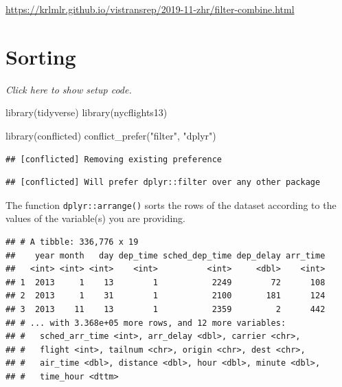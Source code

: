 \documentclass[]{book}
\newenvironment{Shaded}{}{}
\newcommand{\KeywordTok}[1]{\textcolor[rgb]{0.00,0.00,1.00}{#1}}
\newcommand{\NormalTok}[1]{#1}
\newcommand{\OperatorTok}[1]{#1}
\newcommand{\StringTok}[1]{\textcolor[rgb]{0.00,0.50,0.50}{#1}}
\begin{document}
\url{https://krlmlr.github.io/vistransrep/2019-11-zhr/filter-combine.html}

\hypertarget{sorting}{%
\section{Sorting}\label{sorting}}

\emph{Click here to show setup code.}

\begin{Shaded}
\begin{Highlighting}[]
\KeywordTok{library}\NormalTok{(tidyverse)}
\KeywordTok{library}\NormalTok{(nycflights13)}

\KeywordTok{library}\NormalTok{(conflicted)}
\KeywordTok{conflict_prefer}\NormalTok{(}\StringTok{"filter"}\NormalTok{, }\StringTok{"dplyr"}\NormalTok{)}
\end{Highlighting}
\end{Shaded}

\begin{verbatim}
## [conflicted] Removing existing preference
\end{verbatim}

\begin{verbatim}
## [conflicted] Will prefer dplyr::filter over any other package
\end{verbatim}

The function \texttt{dplyr::arrange()} sorts the rows of the dataset according to the values of the variable(s) you are providing.

\begin{Shaded}
\end{Shaded}

\begin{verbatim}
## # A tibble: 336,776 x 19
##    year month   day dep_time sched_dep_time dep_delay arr_time
##   <int> <int> <int>    <int>          <int>     <dbl>    <int>
## 1  2013     1    13        1           2249        72      108
## 2  2013     1    31        1           2100       181      124
## 3  2013    11    13        1           2359         2      442
## # ... with 3.368e+05 more rows, and 12 more variables:
## #   sched_arr_time <int>, arr_delay <dbl>, carrier <chr>,
## #   flight <int>, tailnum <chr>, origin <chr>, dest <chr>,
## #   air_time <dbl>, distance <dbl>, hour <dbl>, minute <dbl>,
## #   time_hour <dttm>
\end{verbatim}
\end{document}
